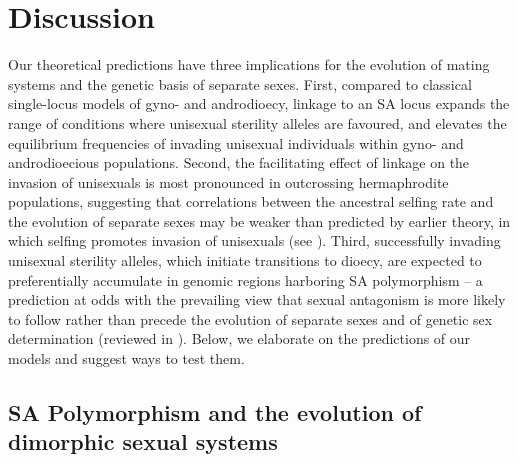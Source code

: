 \documentclass{article}
\newcommand\hl[1]{%
  \bgroup
  \hskip0pt\color{blue!80!black}%
  #1%
  \egroup
}
\begin{document}
\section*{Discussion} \label{sec:Discussion}

Our theoretical predictions have three implications for the evolution of mating systems and the genetic basis of separate sexes. First, compared to classical single-locus models of gyno- and androdioecy, linkage to an SA locus expands the range of conditions where unisexual sterility alleles are favoured, and elevates the equilibrium frequencies of invading unisexual individuals within gyno- and androdioecious populations. Second, the facilitating effect of linkage on the invasion of unisexuals is most pronounced in outcrossing hermaphrodite populations, suggesting that correlations between the ancestral selfing rate and the evolution of separate sexes may be weaker than predicted by earlier theory, in which selfing promotes invasion of unisexuals (see \citealt{Charlesworth1978a}). Third, successfully invading unisexual sterility alleles, which initiate transitions to dioecy, are expected to preferentially accumulate in genomic regions harboring SA polymorphism -- a prediction at odds with the prevailing view that sexual antagonism is more likely to follow rather than precede the evolution of separate sexes and of genetic sex determination (reviewed in \citealt{CharlesworthEtAl2005,Bachtrog2006}). Below, we elaborate on the predictions of our models and suggest ways to test them.

\subsection*{SA Polymorphism and the evolution of dimorphic sexual systems} 

\end{document}
